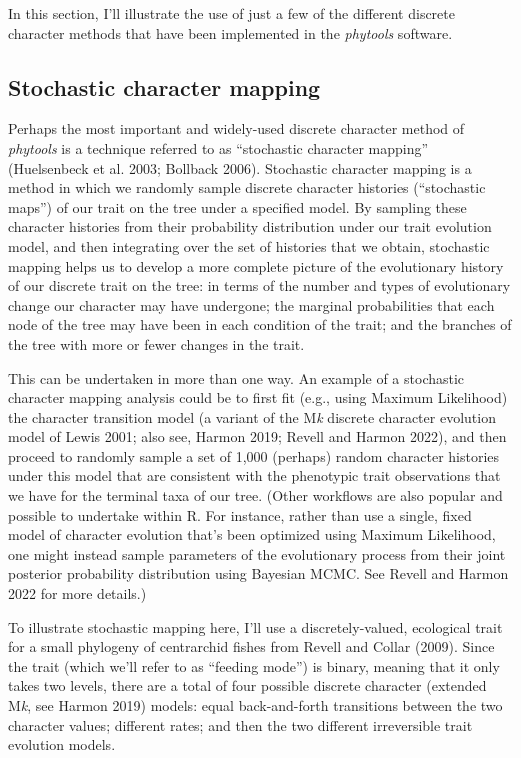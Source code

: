 \documentclass[fleqn,10pt,lineno]{wlpeerj} %
\begin{document}
In this section, I'll illustrate the use of just a few of the different discrete character methods that have been implemented in the \emph{phytools} software.

\hypertarget{stochastic-character-mapping}{%
\subsection{Stochastic character mapping}\label{stochastic-character-mapping}}

Perhaps the most important and widely-used discrete character method of \emph{phytools} is a technique referred to as ``stochastic character mapping'' (Huelsenbeck et al. 2003; Bollback 2006). Stochastic character mapping is a method in which we randomly sample discrete character histories (``stochastic maps'') of our trait on the tree under a specified model. By sampling these character histories from their probability distribution under our trait evolution model, and then integrating over the set of histories that we obtain, stochastic mapping helps us to develop a more complete picture of the evolutionary history of our discrete trait on the tree: in terms of the number and types of evolutionary change our character may have undergone; the marginal probabilities that each node of the tree may have been in each condition of the trait; and the branches of the tree with more or fewer changes in the trait.

This can be undertaken in more than one way. An example of a stochastic character mapping analysis could be to first fit (e.g., using Maximum Likelihood) the character transition model (a variant of the M\emph{k} discrete character evolution model of Lewis 2001; also see, Harmon 2019; Revell and Harmon 2022), and then proceed to randomly sample a set of 1,000 (perhaps) random character histories under this model that are consistent with the phenotypic trait observations that we have for the terminal taxa of our tree. (Other workflows are also popular and possible to undertake within R. For instance, rather than use a single, fixed model of character evolution that's been optimized using Maximum Likelihood, one might instead sample parameters of the evolutionary process from their joint posterior probability distribution using Bayesian MCMC. See Revell and Harmon 2022 for more details.)

To illustrate stochastic mapping here, I'll use a discretely-valued, ecological trait for a small phylogeny of centrarchid fishes from Revell and Collar (2009). Since the trait (which we'll refer to as ``feeding mode'') is binary, meaning that it only takes two levels, there are a total of four possible discrete character (extended M\emph{k}, see Harmon 2019) models: equal back-and-forth transitions between the two character values; different rates; and then the two different irreversible trait evolution models.
\end{document}
